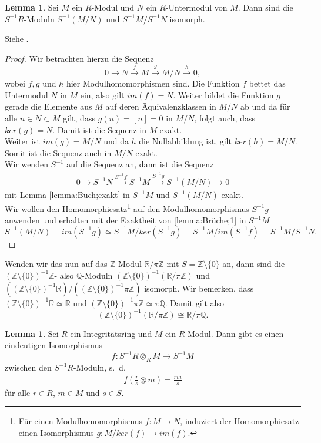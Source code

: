\documentclass[11pt,titlepage]{article}
\newcommand{\setZ}{\mathbb{Z}}
\newcommand{\setQ}{\mathbb{Q}}
\newcommand{\setR}{\mathbb{R}}
\theoremstyle{definition}
\newtheorem{lemma}[theorem]{Lemma}
\theoremstyle{remark}
\begin{document}
	\begin{lemma}
		Sei $M$ ein $R$-Modul und $N$ ein $R$-Untermodul von $M$. Dann sind die $S^{-1}R$-Moduln $S^{-1}(M/N)$ und 
		$S^{-1}M/S^{-1}N$ isomorph.
	\end{lemma}
	
	Siehe \cite[Korollar 3.4 (iii)]{introductiontocomalg}.
	
	\begin{proof}
		Wir betrachten hierzu die Sequenz
		\[0\to N\xrightarrow{f} M\xrightarrow{g} M/N\xrightarrow{h} 0,\]
		wobei $f,g$ und $h$ hier Modulhomomorphismen sind. Die Funktion 
		$f$ bettet das Untermodul $N$ in $M$ ein, also gilt 
		$im(f)=N$. Weiter bildet die Funktion $g$ gerade die Elemente aus $M$ 
		auf deren Äquivalenzklassen in $M/N$ ab und da für alle $n\in N\subset M$ 
		gilt, dass $g(n)=[n]=0$ in $M/N$, folgt auch, dass $ker(g)=N$. Damit 
		ist die Sequenz in $M$ exakt. \\
		Weiter ist $im(g)=M/N$ und da $h$ die Nullabbildung ist, gilt $ker(h)=M/N$. 
		Somit ist die Sequenz auch in $M/N$ exakt. \\
		Wir wenden $S^{-1}$ auf die Sequenz an, dann ist die Sequenz
		\begin{align}
			0\to S^{-1}N \xrightarrow{S^{-1}f} S^{-1}M \xrightarrow{S^{-1}g}
			S^{-1}(M/N)\to 0 \label{lemma:Brüche;1}
		\end{align}
		mit Lemma \ref{lemma:Buch;exakt} in $S^{-1}M$ und $S^{-1}(M/N)$ exakt. \\
		Wir wollen den Homomorphiesatz\footnote{Für einen Modulhomomorphismus 
		$f:M\to N$, induziert der Homomorphiesatz einen Isomorphismus 
		$g:M/ker(f)\to im(f)$.} auf den Modulhomomorphismus 
		$S^{-1}g$ anwenden und erhalten mit der Exaktheit von \ref{lemma:Brüche;1} 
		in $S^{-1}M$
		\[ S^{-1}(M/N)=im(S^{-1}g)\simeq S^{-1}M/ker(S^{-1}g) =S^{-1}M/im(S^{-1}f)=S^{-1}M/S^{-1}N.\]
	\end{proof}
	
	Wenden wir das nun auf das $\setZ$-Modul $\setR /\pi\setZ$ mit 
	$S=\setZ\setminus\{0\}$ an, dann sind die $(\setZ\setminus\{0\})^{-1}\setZ$- also $\setQ$-Moduln 
	$(\setZ\setminus\{0\})^{-1}(\setR /\pi\setZ)$ und 
	$\left((\setZ\setminus\{0\})^{-1}\setR\right) /\left((\setZ\setminus\{0\})^{-1}\pi\setZ\right)$ 
	isomorph. Wir bemerken, dass $(\setZ\setminus\{0\})^{-1}\setR\simeq\setR$ und 
	$(\setZ\setminus\{0\})^{-1}\pi\setZ\simeq\pi\setQ$. Damit gilt also 
	\[ (\setZ\setminus\{0\})^{-1}(\setR /\pi\setZ)\cong \setR/\pi\setQ.\]
	
	\begin{lemma} \label{lemma:lociso}
		Sei $R$ ein Integritätsring und $M$ ein $R$-Modul. Dann gibt es einen 
		eindeutigen Isomorphismus
		\[f:S^{-1}R\otimes_R M\to S^{-1}M\]
		zwischen den $S^{-1}R$-Moduln, s.~d.
		\begin{align}
			f\left(\frac{r}{s}\otimes m\right)=\frac{rm}{s} \label{lemma:lociso;1}
		\end{align}
		für alle $r\in R$, $m\in M$ und $s\in S$.
	\end{lemma}
	
\end{document}

